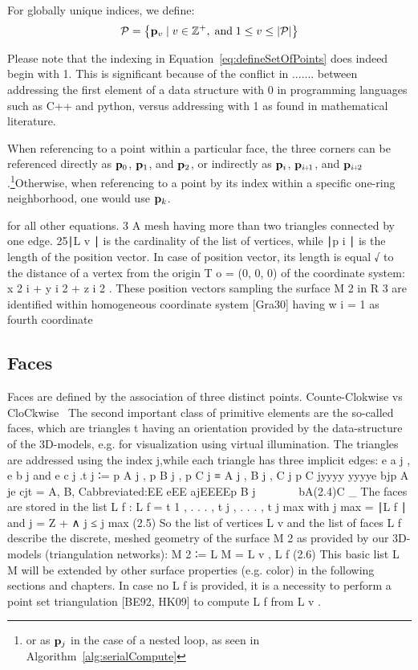 For globally unique indices, we define:
\begin{equation}
	\mathcal{P} = \left \{\mathbf{p}_v \mid v \in \mathbb{Z}^+, \;\text{and}\; 1\leq v \leq|\mathcal{P}| \right \}
	\label{eq:defineSetOfPoints}
\end{equation}%
%

Please note that the indexing in Equation~\ref{eq:defineSetOfPoints} does indeed begin with 1. This is significant because of the conflict in ....... between addressing the first element of a data structure with 0 in programming languages such as C++ and python, versus addressing with 1 as found in mathematical literature.

When referencing to a point within a particular face, the three corners can be referenced directly as $\mathbf{p}_0$, $\mathbf{p}_1$, and $\mathbf{p}_2$, or indirectly as $\mathbf{p}_i$, $\bp_{\sipo}$, and $\bp_{\sipt}$.\footnote{or as $\mathbf{p}_j$ in the case of a nested loop, as seen in Algorithm~\ref{alg:serialCompute}}Otherwise, when referencing to a point by its index within a specific one-ring neighborhood, one would use $\mathbf{p}_k$.


for all other
equations. 3 A mesh having more than two triangles connected by one edge. 25∣L v
∣ is the cardinality of the list of vertices, while ∣p i ∣ is the length of the
position vector.
In case of position vector, its length is equal
√ to the distance of a vertex from the origin
T
o = (0, 0, 0) of the coordinate system: x 2 i + y i 2 + z i 2 . These position
vectors sampling the surface M 2 in R 3 are identified within homogeneous
coordinate system [Gra30] having
w i = 1 as fourth coordinate~\cite[p.~25-26]{Mara12}%
%
%
\subsection{Faces}
\label{chBsF}
Faces are defined by the association of three distinct points.
Counte-Clokwise vs CloCkwise~\cite[p.~00]{todoCitation}\todoCitation
The second important class of primitive elements are the so-called faces, which
are triangles t having an orientation provided by the data-structure of the
3D-models, e.g. for visualization using virtual illumination. The triangles are
addressed using the index j,while each triangle has three implicit edges: e a j
, e b j and e c j .t j ∶= {p A j , p B j , p C j } ≡ {A j , B j , C j }p C jyyyy
yyyye bjp A je cjt = {A, B, C}abbreviated:EE eEE ajEEEEp B j~~~~~~ ~bA(2.4)C \_
The faces are stored in the list L f : L f = { t 1 , . . . , t j , . . . , t j
max } with j max = ∣L f ∣ and j = Z + ∧ j ≤ j max
(2.5)
So the list of vertices L v and the list of faces L f describe the discrete,
meshed geometry of the surface M 2 as provided by our 3D-models (triangulation
networks): M 2 ∶= L M = {L v , L f } (2.6)
This basic list L M will be extended by other surface properties (e.g. color) in
the following sections and chapters. In case no L f is provided, it is a
necessity to perform a point set triangulation [BE92, HK09] to compute L f from
L v .~\cite[p.~26]{Mara12}
%
